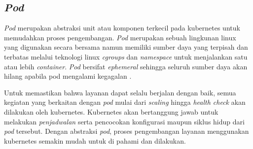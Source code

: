 \subsection{\textit{Pod}}

\textit{Pod} merupakan abstraksi unit atau komponen terkecil pada kubernetes untuk memudahkan proses pengembangan. \textit{Pod} merupakan sebuah lingkunan linux yang digunakan secara bersama namun memiliki sumber daya yang terpisah dan terbatas melalui teknologi linux \textit{cgroups} dan \textit{namespace} untuk menjalankan satu atau lebih \textit{container}. \textit{Pod} bersifat \textit{ephemeral} sehingga seluruh sumber daya akan hilang apabila pod mengalami kegagalan \parencite{pod}.

Untuk memastikan bahwa layanan dapat selalu berjalan dengan baik, semua kegiatan yang berkaitan dengan \textit{pod} mulai dari \textit{scaling} hingga \textit{health check} akan dilakukan oleh kubernetes. Kubernetes akan bertanggung jawab untuk melakukan \textit{penjadwalan} serta pencocokan konfigurasi maupun siklus hidup dari \textit{pod} tersebut. Dengan abstraksi \textit{pod}, proses pengembangan layanan menggunakan kubernetes semakin mudah untuk di pahami dan dilakukan.
